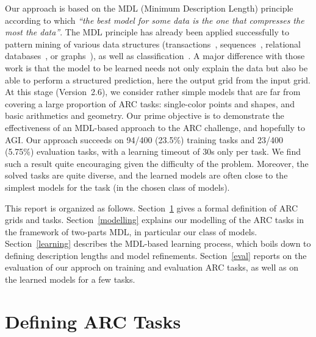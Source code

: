 \documentclass[a4paper]{llncs}
\newcommand{\HIDE}[1]{}
\begin{document}
Our approach is based on the MDL (Minimum Description Length)
principle~\cite{Rissanen1978,Grunwald2019} according to which {\em ``the best
model for some data is the one that compresses the most the data''}.
%
The MDL principle has already been applied successfully to pattern
mining of various data structures (transactions~\cite{KRIMP2011},
sequences~\cite{sqs2012}, relational databases~\cite{rdb_krimp2009},
or graphs~\cite{BarCelFer2020ida}), as well as
classification~\cite{ProLee2020}.
%
A major difference with those work is that the model to be learned
needs not only explain the data but also be able to perform a
structured prediction, here the output grid from the input grid.
%
At this stage (Version~2.6), we consider rather simple models that
are far from covering a large proportion of ARC tasks: single-color
points and shapes, and basic arithmetics and geometry. Our
prime objective is to demonstrate the effectiveness of an MDL-based
approach to the ARC challenge, and hopefully to AGI. Our approach
succeeds on 94/400 (23.5\%) training tasks and 23/400 (5.75\%)
evaluation tasks, with a learning timeout of 30s only per task. We
find such a result quite encouraging given the difficulty of the
problem. Moreover, the solved tasks are quite diverse, and the
learned models are often close to the simplest models for the task (in
the chosen class of models).

This report is organized as follows. Section~\ref{arc} gives a formal
definition of ARC grids and tasks. \HIDE{Section~\ref{related} discusses
related work on artificial intelligence, in particular structured
prediction, AGI, or programming by demonstration; it also presents the
MDL principle and some of its applications to AI and knowledge
discovery.} Section~\ref{modelling} explains our modelling of the ARC
tasks in the framework of two-parts MDL, in particular our class of
models. Section~\ref{learning} describes the MDL-based learning
process, which boils down to defining description lengths and model
refinements. Section~\ref{eval} reports on the evaluation of our
approch on training and evaluation ARC tasks, as well as on the
learned models for a few tasks.


\section{Defining ARC Tasks}
\label{arc}
\end{document}
